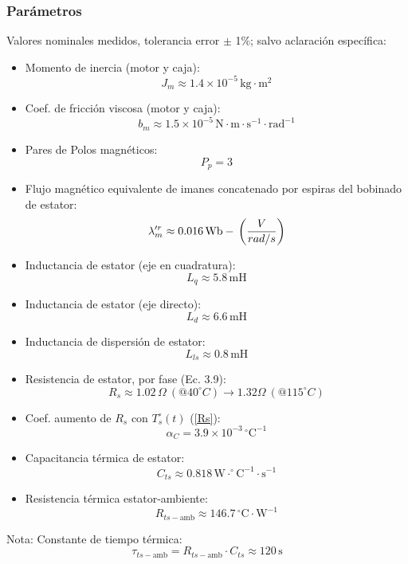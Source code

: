 \documentclass[a4paper, 10pt, journal]{ieeeconf}
\begin{document}
\subsubsection{\textbf{Parámetros}} Valores nominales medidos, tolerancia error $\pm$ 1\%; salvo aclaración específica:
\begin{itemize}
    \item Momento de inercia (motor y caja):
    \[J_m \approx 1.4 \times 10^{-5} \, \text{kg} \cdot \text{m}^2\]
    \item Coef. de fricción viscosa (motor y caja):
    \[b_m \approx 1.5 \times 10^{-5} \, \text{N} \cdot \text{m} \cdot \text{s}^{-1} \cdot \text{rad}^{-1}\]
    \item Pares de Polos magnéticos: 
    \[P_p = 3\]
    \item Flujo magnético equivalente de imanes concatenado por espiras del bobinado de estator:
    \[\lambda_m'^{r} \approx 0.016 \, \text{Wb} \\-\\ \left(\frac{V}{rad/s}\right)\]
    \item Inductancia de estator (eje en cuadratura):
    \[L_q \approx 5.8 \, \text{mH}\]
    \item Inductancia de estator (eje directo):
    \[L_d \approx 6.6 \, \text{mH}\]
    \item Inductancia de dispersión de estator:
    \[L_{ls} \approx 0.8 \, \text{mH}\]
    \item Resistencia de estator, por fase (Ec. 3.9):
    \[R_s \approx 1.02 \, \Omega \ (@40 ^\circ C) \rightarrow 1.32 \Omega \ (@115 ^\circ C)\]
    \item Coef. aumento de $R_s$ con $T_s^\circ(t)$ (\ref{Rs}): \[\alpha_C = 3.9 \times 10^{-3} \, ^{\circ}\text{C}^{-1}\]
    \item Capacitancia térmica de estator:
    \[C_{ts} \approx 0.818 \, \text{W} \cdot ^{\circ}\text{C}^{-1} \cdot \text{s}^{-1}\]
    \item Resistencia térmica estator-ambiente:
    \[R_{ts-\text{amb}} \approx 146.7 \, ^{\circ}\text{C} \cdot \text{W}^{-1}\]
\end{itemize}
Nota: Constante de tiempo térmica:
\[\tau_{ts-\text{amb}} = R_{ts-\text{amb}} \cdot C_{ts} \approx 120 \, \text{s}\]
\end{document}
